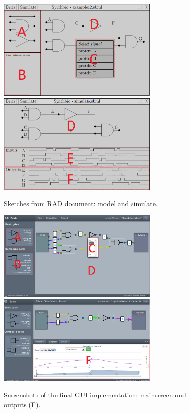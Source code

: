 \documentclass[a4paper]{article}
\begin{document}
\begin{figure}[h!]
\includegraphics[width=8cm]{pictures/gui_sketch1_marks.png} 
\includegraphics[width=8cm]{pictures/gui_sketch2_marks.png}
\caption{Sketches from RAD document: model and simulate.}
\end{figure}

\begin{figure}[h!]
\includegraphics[width=8cm]{pictures/gui_final1_marks.png} 
\includegraphics[width=8cm]{pictures/gui_final2_marks.png}
\caption{Screenshots of the final GUI implementation: mainscreen and outputs (F).}
\end{figure}
\end{document}
